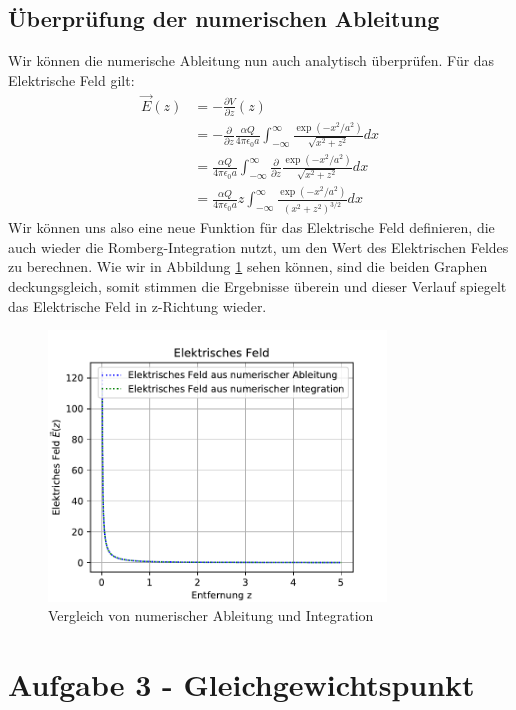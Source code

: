 \documentclass[12pt,a4paper]{article}
\begin{document}
\subsection{Überprüfung der numerischen Ableitung}
Wir können die numerische Ableitung nun auch analytisch überprüfen. Für das Elektrische Feld gilt:
\begin{align*}
	\vec{E}(z) &= -\frac{\partial V}{\partial z}(z) \\
	&= -\frac{\partial}{\partial z}\frac{\alpha Q}{4\pi \epsilon_0 a}\int_{-\infty}^{\infty}\frac{\exp(-x^2/a^2)}{\sqrt{x^2+z^2}}dx \\
	&= \frac{\alpha Q}{4\pi \epsilon_0 a}\int_{-\infty}^{\infty}\frac{\partial}{\partial z} \frac{\exp(-x^2/a^2)}{\sqrt{x^2+z^2}}dx \\
	&= \frac{\alpha Q}{4\pi \epsilon_0 a}z\int_{-\infty}^{\infty} \frac{\exp(-x^2/a^2)}{ (x^2+z^2)^{3/2}} dx
\end{align*}
Wir können uns also eine neue Funktion für das Elektrische Feld definieren, die auch wieder die Romberg-Integration nutzt, um den Wert des Elektrischen Feldes zu berechnen.
Wie wir in Abbildung \ref{f:e_field_2} sehen können, sind die beiden Graphen deckungsgleich, somit stimmen die Ergebnisse überein und dieser Verlauf spiegelt das Elektrische Feld in z-Richtung wieder.
\begin{figure}[htbp]
	\includegraphics[width=0.8\textwidth]{aufgabe2_2.pdf}
	\caption{Vergleich von numerischer Ableitung und Integration}
	\label{f:e_field_2}
\end{figure}
\section{Aufgabe 3 - Gleichgewichtspunkt}
\end{document}
